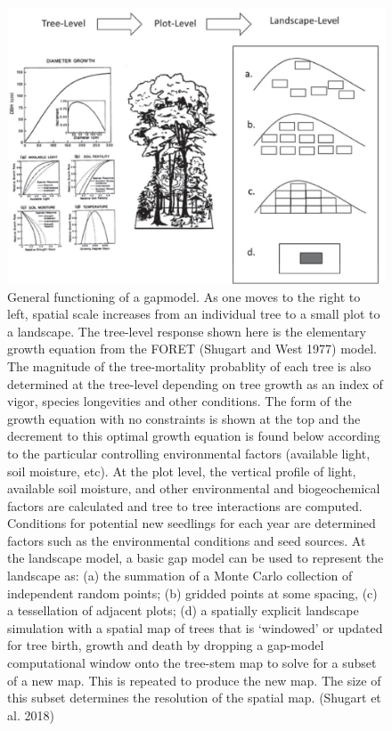 \documentclass[
  12pt,
  oneside]{book}
\begin{document}
\begin{figure}

{\centering \includegraphics[width=0.8\linewidth]{figures/chap6/f611_gap_upscaling_shurgart} 

}

\caption{General functioning of a gapmodel. As one moves to the right to left, spatial scale increases from an individual tree to a small plot to a landscape. The tree-level response shown here is the elementary growth equation from the FORET (Shugart and West 1977) model. The magnitude of the tree-mortality probablity of each tree is also determined at the tree-level depending on tree growth as an index of vigor, species longevities and other conditions. The form of the growth equation with no constraints is shown at the top and the decrement to this optimal growth equation is found below according to the particular controlling environmental factors (available light, soil moisture, etc). At the plot level, the vertical profile of light, available soil moisture, and other environmental and biogeochemical factors are calculated and tree to tree interactions are computed. Conditions for potential new seedlings for each year are determined factors such as the environmental conditions and seed sources. At the landscape model, a basic gap model can be used to represent the landscape as: (a) the summation of a Monte Carlo collection of independent random points; (b) gridded points at some spacing, (c) a tessellation of adjacent plots; (d) a spatially explicit landscape simulation with a spatial map of trees that is ‘windowed’ or updated for tree birth, growth and death by dropping a gap-model computational window onto the tree-stem map to solve for a subset of a new map. This is repeated to produce the new map. The size of this subset determines the resolution of the spatial map. (Shugart et al. 2018)}\label{fig:f611}
\end{figure}
\end{document}
